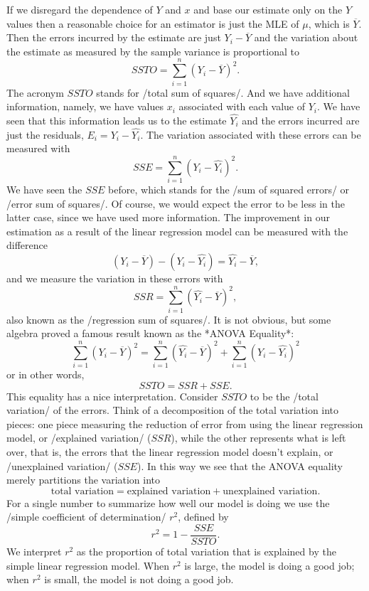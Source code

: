 If we disregard the dependence of \(Y\) and \(x\) and base our
estimate only on the \(Y\) values then a reasonable choice for an
estimator is just the MLE of \(\mu\), which is \(\overline{Y}\). Then
the errors incurred by the estimate are just \(Y_{i}-\overline{Y}\)
and the variation about the estimate as measured by the sample
variance is proportional to
\begin{equation}
SSTO=\sum_{i=1}^{n}(Y_{i}-\overline{Y})^{2}.
\end{equation}
The acronym \(SSTO\) stands for /total sum of squares/.  And we have
additional information, namely, we have values \(x_{i}\) associated
with each value of \(Y_{i}\). We have seen that this information leads
us to the estimate \(\hat{Y_{i}}\) and the errors incurred are just
the residuals, \(E_{i}=Y_{i}-\hat{Y_{i}}\). The variation associated
with these errors can be measured with
\begin{equation}
SSE=\sum_{i=1}^{n}(Y_{i}-\hat{Y_{i}})^{2}.
\end{equation}
We have seen the \(SSE\) before, which stands for the /sum of squared
errors/ or /error sum of squares/. Of course, we would expect the
error to be less in the latter case, since we have used more
information. The improvement in our estimation as a result of the
linear regression model can be measured with the difference \[
(Y_{i}-\overline{Y})-(Y_{i}-\hat{Y_{i}})=\hat{Y_{i}}-\overline{Y}, \]
and we measure the variation in these errors with
\begin{equation}
SSR=\sum_{i=1}^{n}(\hat{Y_{i}}-\overline{Y})^{2},
\end{equation}
also known as the /regression sum of squares/. It is not obvious, but
some algebra proved a famous result known as the *ANOVA Equality*:
\begin{equation}
\label{eq-anovaeq}
\sum_{i=1}^{n}(Y_{i}-\overline{Y})^{2}=\sum_{i=1}^{n}(\hat{Y_{i}}-\overline{Y})^{2}+\sum_{i=1}^{n}(Y_{i}-\hat{Y_{i}})^{2}
\end{equation}
or in other words,
\begin{equation}
SSTO=SSR+SSE.
\end{equation}
This equality has a nice interpretation. Consider \(SSTO\) to be the
/total variation/ of the errors. Think of a decomposition of the total
variation into pieces: one piece measuring the reduction of error from
using the linear regression model, or /explained variation/ (\(SSR\)),
while the other represents what is left over, that is, the errors that
the linear regression model doesn't explain, or /unexplained
variation/ (\(SSE\)). In this way we see that the ANOVA equality
merely partitions the variation into \[ \mbox{total
variation}=\mbox{explained variation}+\mbox{unexplained variation}.
\] For a single number to summarize how well our model is doing we use
the /simple coefficient of determination/ \(r^{2}\), defined by
\begin{equation}
r^{2}=1-\frac{SSE}{SSTO}.
\end{equation}
We interpret \(r^{2}\) as the proportion of total variation that is
explained by the simple linear regression model. When \(r^{2}\) is
large, the model is doing a good job; when \(r^{2}\) is small, the
model is not doing a good job.

